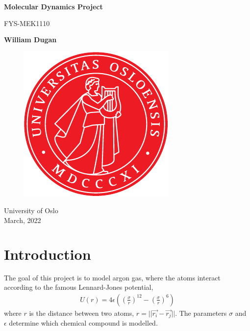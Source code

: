 \documentclass[a4paper,10pt,english]{article}
\begin{document}
\begin{titlepage}
    \begin{center}
        \vspace*{1cm}
            
        \Huge
        \textbf{Molecular Dynamics Project}
            
        \vspace{0.5cm}
        \LARGE
        FYS-MEK1110
            
        \vspace{1.5cm}
            
        \textbf{William Dugan}
            
        \vfill
    
        \begin{figure}[h!] 
            \centering 
            \includegraphics[scale=.7]{../figures/uio_logo.pdf} 
        \end{figure}    
        
        \Large
        University of Oslo\\
        March, 2022
    \end{center}
\end{titlepage}

\newpage
{
  \tableofcontents
}

\newpage

\section{Introduction} \label{1}

The goal of this project is to model argon gas, where the atoms interact according to the famous Lennard-Jones potential,
\begin{align} \label{eq:1}
    U(r) = 4 \epsilon 
    \left(
        \left( 
            \frac{\sigma}{r}
        \right)^{12} 
        - \left(
            \frac{\sigma}{r}
        \right)^6
    \right)
\end{align}
where $r$ is the distance between two atoms, $r=||\Vec{r_i}-\Vec{r_j}||$. The parameters $\sigma$ and $\epsilon$ determine which chemical compound is modelled.
\end{document}
